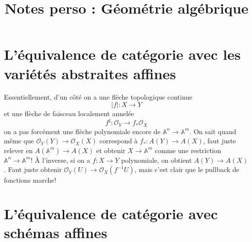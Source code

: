 \documentclass[a4paper,12pt]{book}
\title{Notes perso : Géométrie algébrique}
\date{}
\newcommand{\A}{\mathbb{A}}
\newcommand{\Or}{\mathcal{O}}
\theoremstyle{plain}
\theoremstyle{definition}
\theoremstyle{remark}
\begin{document}
\maketitle
\tableofcontents



\section{L'équivalence de catégorie avec les variétés abstraites affines}
Essentiellement, d'un côté on a une flèche topologique continue 
\[|f|\colon X\to Y\]
et une flèche de faisceau localement annelée
\[f^\sharp\colon \Or_Y\to f_*\Or_X\]
on a pas forcément une flèche polynomiale encore de $\A^n\to \A^m$.
On sait quand même que $\Or_Y(Y)\to \Or_X(X)$ correspond à 
$f_*\colon A(Y)\to A(X)$, faut juste relever en $A(\A^m)\to A(X)$
et obtenir $X\to \A^m$ comme une restriction $\A^n\to \A^m$! À l'inverse,
si on a $f\colon X\to Y$ polynomiale, on obtient $A(Y)\to A(X)$. Faut
juste obtenir $\Or_Y(U)\to \Or_X(f^{-1} U)$, mais c'est clair que le 
pullback de fonctions marche!




\section{L'équivalence de catégorie avec schémas affines}
\end{document}

